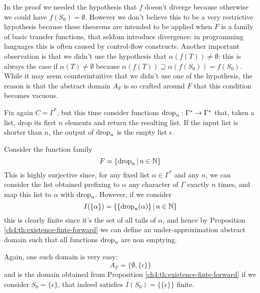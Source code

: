 In the proof we needed the hypothesis that $f$ doesn't diverge because otherwise we could have $f(S_0) = \emptyset$. However we don't believe this to be a very restrictive hypothesis because these theorems are intended to be applied when $F$ is a family of basic transfer functions, that seldom introduce divergence: in programming languages this is often caused by control-flow constructs.
Another important observation is that we didn't use the hypothesis that $\alpha(f(T)) \neq \emptyset$: this is always the case if $\alpha(T) \neq \emptyset$ because $\alpha(f(T)) \supseteq \alpha(f(S_0)) = f(S_0)$. While it may seem counterintuitive that we didn't use one of the hypothesis, the reason is that the abstract domain $A_F$ is so crafted around $F$ that this condition becomes vacuous.

\begin{example}
	Fix again $C = \Gamma^{*}$, but this time consider functions $\text{drop}_n : \Gamma^* \rightarrow \Gamma^*$ that, taken a list, drop its first $n$ elements and return the resulting list. If the input list is shorter than $n$, the output of $\text{drop}_n$ is the empty list $\epsilon$.

	Consider the function family
	\[
	F = \{ \text{drop}_n \,\vert\, n \in \mathbb{N} \}
	\]
	This is highly surjective since, for any fixed list $\alpha \in \Gamma^*$ and any $n$, we can consider the list obtained prefixing to $\alpha$ any character of $\Gamma$ exactly $n$ times, and map this list to $\alpha$ with $\text{drop}_n$.
	However, if we consider
	\[
	I(\{ \alpha \}) = \{ \{ \text{drop}_n(\alpha) \} \,\vert\, n \in \mathbb{N} \}
	\]
	this is clearly finite since it's the set of all tails of $\alpha$, and hence by Proposition \ref{ch4:th:existence-finte-forward} we can define an under-approximation abstract domain such that all functions $\text{drop}_n$ are non emptying.

	Again, one such domain is very easy:
	\[
	A_F = \{ \emptyset, \{ \epsilon \} \}
	\]
	and is the domain obtained from Proposition \ref{ch4:th:existence-finte-forward} if we consider $S_0 = \{ \epsilon \}$, that indeed satisfies $I(S_0) = \{ \{ \epsilon \} \}$ finite.
\end{example}

